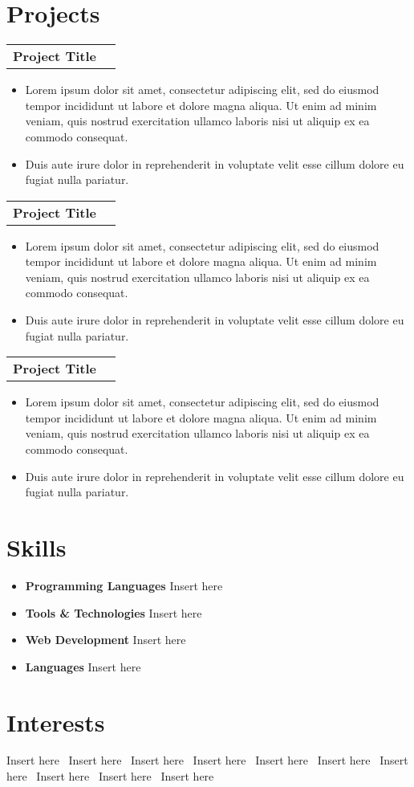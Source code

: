 \documentclass[11pt,letterpaper]{article}
\makeatletter
\newcommand{\cvProjectHeader}[1]{
    \begin{tabular*}{\textwidth}{@{}l@{\extracolsep{\fill}}r@{}}
        \textbf{#1}
    \end{tabular*}}
\newcommand{\cvListBegin}{\begin{itemize}[leftmargin=*]}
\newcommand{\cvListEnd}{\end{itemize}}
\newcommand{\cvListItem}{\item}
\makeatother
\begin{document}
    \section*{Projects}
        \cvProjectHeader
            {Project Title}

            \cvListBegin
                \cvListItem Lorem ipsum dolor sit amet, consectetur adipiscing elit, sed do eiusmod tempor incididunt ut labore et dolore magna aliqua. Ut enim ad minim veniam, quis nostrud exercitation ullamco laboris nisi ut aliquip ex ea commodo consequat.
                \cvListItem Duis aute irure dolor in reprehenderit in voluptate velit esse cillum dolore eu fugiat nulla pariatur.
            \cvListEnd

        \cvProjectHeader
            {Project Title}

            \cvListBegin
                \cvListItem Lorem ipsum dolor sit amet, consectetur adipiscing elit, sed do eiusmod tempor incididunt ut labore et dolore magna aliqua. Ut enim ad minim veniam, quis nostrud exercitation ullamco laboris nisi ut aliquip ex ea commodo consequat.
                \cvListItem Duis aute irure dolor in reprehenderit in voluptate velit esse cillum dolore eu fugiat nulla pariatur.
            \cvListEnd

        \cvProjectHeader
            {Project Title}

            \cvListBegin
                \cvListItem Lorem ipsum dolor sit amet, consectetur adipiscing elit, sed do eiusmod tempor incididunt ut labore et dolore magna aliqua. Ut enim ad minim veniam, quis nostrud exercitation ullamco laboris nisi ut aliquip ex ea commodo consequat.
                \cvListItem Duis aute irure dolor in reprehenderit in voluptate velit esse cillum dolore eu fugiat nulla pariatur.
            \cvListEnd


    \section*{Skills}
        \cvListBegin
            \cvListItem \textbf{Programming Languages} Insert here
            \cvListItem \textbf{Tools \& Technologies} Insert here
            \cvListItem \textbf{Web Development} Insert here
            \cvListItem \textbf{Languages} Insert here
        \cvListEnd

    \section*{Interests}
        Insert here \textbullet\
        Insert here \textbullet\
        Insert here \textbullet\
        Insert here \textbullet\
        Insert here \textbullet\
        Insert here \textbullet\
        Insert here \textbullet\
        Insert here \textbullet\
        Insert here \textbullet\
        Insert here
\end{document}
